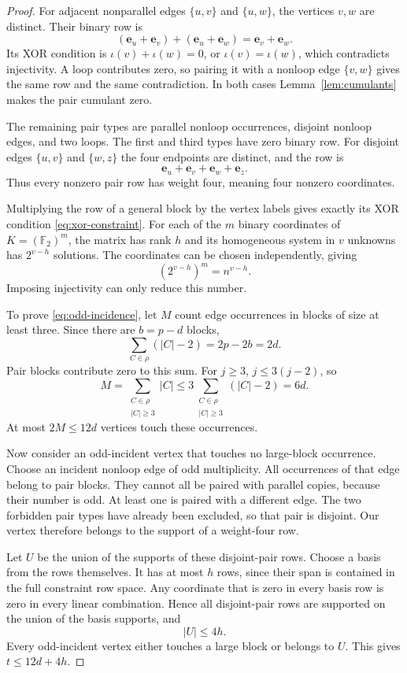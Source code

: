 \documentclass[11pt]{article}
\theoremstyle{definition}
\theoremstyle{remark}
\theoremstyle{plain}
\newcommand{\F}{\mathbb F}
\begin{document}
\begin{proof}
For adjacent nonparallel edges $\{u,v\}$ and $\{u,w\}$, the
vertices $v,w$ are distinct. Their binary row is
\[
 (\mathbf e_u+\mathbf e_v)+(\mathbf e_u+\mathbf e_w)
       =\mathbf e_v+\mathbf e_w.
\]
Its XOR condition is $\iota(v)+\iota(w)=0$, or
$\iota(v)=\iota(w)$, which contradicts injectivity. A loop
contributes zero, so pairing it with a nonloop edge $\{v,w\}$
gives the same row and the same contradiction. In both cases
Lemma~\ref{lem:cumulants} makes the pair cumulant zero.

The remaining pair types are parallel nonloop occurrences,
disjoint nonloop edges, and two loops. The first and third types
have zero binary row. For disjoint edges $\{u,v\}$ and
$\{w,z\}$ the four endpoints are distinct, and the row is
\[
                  \mathbf e_u+\mathbf e_v+\mathbf e_w+\mathbf e_z.
\]
Thus every nonzero pair row has weight four, meaning four nonzero
coordinates.

Multiplying the row of a general block by the vertex labels gives
exactly its XOR condition \eqref{eq:xor-constraint}. For each of
the $m$ binary coordinates of $K=(\F_2)^m$, the matrix has rank
$h$ and its homogeneous system in $v$ unknowns has $2^{v-h}$
solutions. The coordinates can be chosen independently, giving
\[
                         (2^{v-h})^m=n^{v-h}.
\]
Imposing injectivity can only reduce this number.

To prove \eqref{eq:odd-incidence}, let $M$ count edge occurrences
in blocks of size at least three. Since there are $b=p-d$ blocks,
\[
 \sum_{C\in\rho}(|C|-2)=2p-2b=2d.
\]
Pair blocks contribute zero to this sum. For $j\ge3$,
$j\le3(j-2)$, so
\[
 M=\sum_{\substack{C\in\rho\\|C|\ge3}}|C|
   \le3\sum_{\substack{C\in\rho\\|C|\ge3}}(|C|-2)=6d.
\]
At most $2M\le12d$ vertices touch these occurrences.

Now consider an odd-incident vertex that touches no large-block
occurrence. Choose an incident nonloop edge of odd multiplicity.
All occurrences of that edge belong to pair blocks. They cannot
all be paired with parallel copies, because their number is odd.
At least one is paired with a different edge. The two forbidden
pair types have already been excluded, so that pair is disjoint.
Our vertex therefore belongs to the support of a weight-four row.

Let $U$ be the union of the supports of these disjoint-pair rows.
Choose a basis from the rows themselves. It has at most $h$ rows,
since their span is contained in the full constraint row space.
Any coordinate that is zero in every basis row is zero in every
linear combination. Hence all disjoint-pair rows are supported
on the union of the basis supports, and
\[
                              |U|\le4h.
\]
Every odd-incident vertex either touches a large block or belongs
to $U$. This gives $t\le12d+4h$.
\end{proof}
\end{document}
